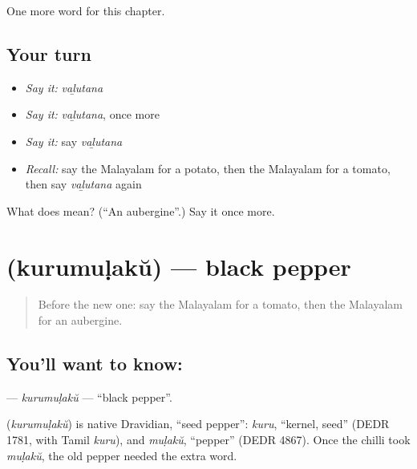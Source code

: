 \begin{grammarlens}[title={What you've built}]
One more word for this chapter.
\end{grammarlens}

\subsection*{Your turn}
\begin{itemize}
\raggedright
  \item \emph{Say it:} \emph{vaḻutana}
  \item \emph{Say it:} \emph{vaḻutana}, once more
  \item \emph{Say it:} say \emph{vaḻutana}
  \item \emph{Recall:} say the Malayalam for a potato, then the Malayalam for a tomato, then say \emph{vaḻutana} again
\end{itemize}

\begin{tcolorbox}[breakable,colback=teal!4,colframe=teal!35!black,title={Before you move on}]
What does  mean? (\textquotedblleft{}An aubergine\textquotedblright{}.) Say it once more.
\end{tcolorbox}
\section[\texorpdfstring{\ml{കുരുമുളക്} (kurumuḷakŭ)}{കുരുമുളക് (kurumuḷakŭ)}]{ (kurumuḷakŭ) — black pepper}

\label{lesson:ML-C150-kurumulaku}



\begin{quote}
Before the new one: say the Malayalam for a tomato, then the Malayalam for an aubergine.
\end{quote}

\subsection*{You'll want to know: }
\textbf{} — \emph{kurumuḷakŭ} — \textquotedblleft{}black pepper\textquotedblright{}.

\begin{cousinweb}
\textbf{} (\emph{kurumuḷakŭ}) is native Dravidian, \textquotedblleft{}seed pepper\textquotedblright{}: \emph{kuru}, \textquotedblleft{}kernel, seed\textquotedblright{} (DEDR 1781, with Tamil \emph{kuru}), and \emph{muḷakŭ}, \textquotedblleft{}pepper\textquotedblright{} (DEDR 4867). Once the chilli took \emph{muḷakŭ}, the old pepper needed the extra word.
\end{cousinweb}

